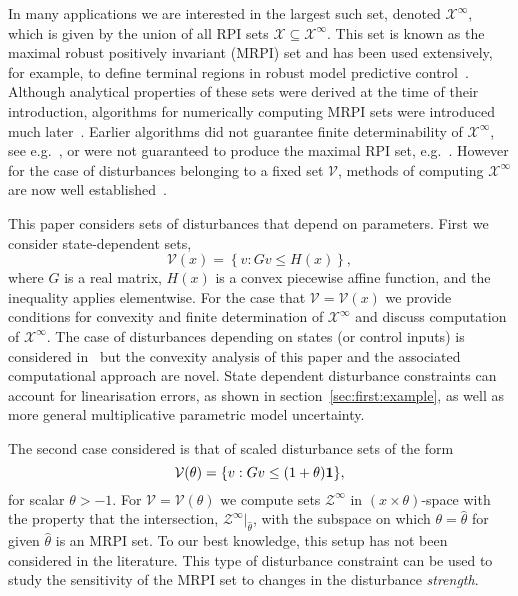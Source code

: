 \documentclass[letterpaper, 10pt, conference]{ieeeconf} %
\begin{document}
In many applications we are interested in the largest such set, denoted $\mathcal X^\infty$, which is given 
by the union of all RPI sets $\mathscr X\subseteq\mathcal X^\infty$. This set is known as the maximal robust 
positively invariant (MRPI) set and has been used extensively, for example, to define terminal regions in 
robust model predictive control~\cite{mayne:2000}. Although analytical properties
of these sets were derived at the time of their introduction, algorithms for numerically computing MRPI sets 
were introduced much later~\cite{Blanchini:1994,DeSantis:1994,Kolmanovsky:1998}. 
Earlier algorithms did not guarantee finite determinability of $\mathcal X^\infty$, see e.g.~\cite{Blanchini:1990}, 
or were not guaranteed to produce the maximal RPI set, e.g.~\cite{Blanchini:1991}. 
%
However for the case of disturbances belonging to a fixed set $\mathscr V$, methods of computing 
$\mathcal X^\infty$ are now well established~\cite{blanchini:2007}.

This paper considers sets of disturbances that depend on
parameters. First we consider state-dependent sets,
\begin{equation}\label{eq:PWA:disturbance:set}
	\mathcal V(x) = \left\{v: Gv\leq H(x)\right\},
\end{equation}
where $G$ is a real matrix,
$H(x)$ is a convex piecewise affine function, and the inequality applies elementwise. For the case that $\mathscr V=\mathcal V(x)$ we
provide conditions for convexity and finite determination of $\mathcal X^\infty$ and discuss 
computation of $\mathcal X^\infty$. The case of disturbances depending on states (or control inputs) 
is considered in~\cite{Kuntsevich:1995,rakovic06} but the convexity
analysis of this paper and the associated computational approach are novel. 
State dependent disturbance constraints can account for linearisation errors, as shown in section~\ref{sec:first:example}, 
as well as more general multiplicative parametric model uncertainty.

The second case considered is that of scaled disturbance sets of the form
\begin{equation}
  \mathcal V(\theta) = \{v:Gv\leq(1+\theta){\bf{1}}\},
\end{equation}
for scalar $\theta>-1$. For $\mathscr V = \mathcal V(\theta)$ we compute sets $\mathcal Z^\infty$ in 
$(x\times\theta)$-space with the property that 
the intersection, $\mathcal Z^\infty\vert_{\hat\theta}$, with the subspace on which $\theta=\hat\theta$ 
for given $\hat\theta$ is an MRPI set. To our best knowledge, this setup has not been 
considered in the literature. This type of disturbance constraint can be used to study the sensitivity of
the MRPI set to changes in the disturbance \emph{strength}.
\end{document}
